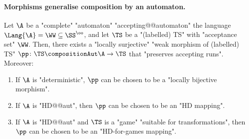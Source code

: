 \documentclass{theoretics}
\begin{document}
\paragraph*{Morphisms generalise composition by an automaton.}

\begin{proposition}\label{prop-morph:product-by-aut-induces-mapping}
	Let $\A$ be a "complete" "automaton" "accepting@@automaton" the language $\Lang{\A} = \WW\subseteq \SS^\oo$, and let $\TS$ be a "(labelled) TS" with "acceptance set" $\WW$. 
	Then, there exists a "locally surjective" "weak morphism of (labelled) TS" $\pp\colon \TS \compositionAut \A \to \TS$ that "preserves accepting runs". Moreover:
	\begin{enumerate}
		\item If $\A$ is "deterministic", $\pp$ can be chosen to be a "locally bijective morphism".
		\item If $\A$ is "HD@@aut", then $\pp$ can be chosen to be an "HD mapping".
		\item If $\A$ is "HD@@aut" and $\TS$ is a "game" "suitable for transformations", then $\pp$ can be chosen to be an "HD-for-games mapping".
	\end{enumerate}	
\end{proposition}
\end{document}
